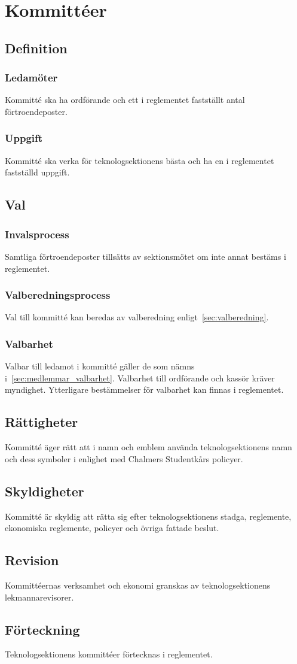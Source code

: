 \section{Kommittéer}
\subsection{Definition}
\subsubsection{Ledamöter}
Kommitté ska ha ordförande och ett i reglementet fastställt antal förtroendeposter.

\subsubsection{Uppgift}
Kommitté ska verka för teknologsektionens bästa och ha en i reglementet fastställd uppgift.

\subsection{Val}
\subsubsection{Invalsprocess}
Samtliga förtroendeposter tillsätts av sektionsmötet om inte annat bestäms i reglementet.
\subsubsection{Valberedningsprocess}
Val till kommitté kan beredas av valberedning enligt~\ref{sec:valberedning}.

\subsubsection{Valbarhet}
Valbar till ledamot i kommitté gäller de som nämns i~\ref{sec:medlemmar_valbarhet}.
Valbarhet till ordförande och kassör kräver myndighet.
Ytterligare bestämmelser för valbarhet kan finnas i reglementet.

\subsection{Rättigheter}
Kommitté äger rätt att i namn och emblem använda teknologsektionens namn och dess symboler i enlighet med Chalmers Studentkårs policyer.
\subsection{Skyldigheter}
Kommitté är skyldig att rätta sig efter teknologsektionens stadga, reglemente, ekonomiska reglemente, policyer och övriga fattade beslut.
\subsection{Revision}
Kommittéernas verksamhet och ekonomi granskas av teknologsektionens lekmannarevisorer.
\subsection{Förteckning}
Teknologsektionens kommittéer förtecknas i reglementet.

